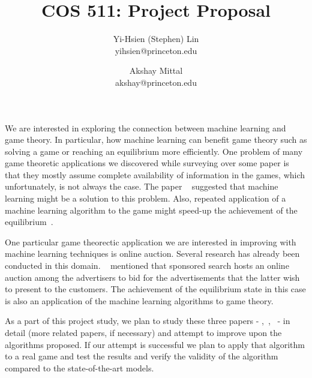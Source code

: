 \documentclass[12pt]{article}
\begin{document}
\title{COS 511: Project Proposal}
\author{
  Yi-Hsien (Stephen) Lin\\ yihsien@princeton.edu
  \and
  Akshay Mittal \\ akshay@princeton.edu
}
\date{}

\maketitle

\noindent 

We are interested in exploring the connection between machine learning and game theory. In particular, how machine learning can benefit game theory such as solving a game or reaching an equilibrium more efficiently. One problem of many game theoretic applications we discovered while surveying over some paper is that they mostly assume complete
 availability of information in the games, which unfortunately, is not always the case. The paper ~\cite{Blum:2006} suggested that machine learning might be a solution to this problem. Also, repeated application of a machine learning
 algorithm to the game might speed-up the achievement of the
 equilibrium~\cite{Freund:1996}.

One particular game theorectic application we are interested in improving with machine learning techniques is online auction. Several research has already been conducted in this domain. ~\cite{He:2013} mentioned that sponsored search
 hosts an online auction among the advertisers to bid for the advertisements
 that the latter wish to present to the customers. The achievement of the
 equilibrium state in this case is also an application of the machine learning
 algorithms to game theory. 

\noindent As a part of this project study, we plan to study these three papers -
\cite{Freund:1996},~\cite{Blum:2006},~\cite{He:2013} - in detail (more related
 papers, if necessary) and attempt to improve upon the algorithms proposed. If
 our attempt is successful we plan to apply that algorithm to a real game and
 test the results and verify the validity of the algorithm compared to the
 state-of-the-art models.


{\footnotesize


}
\end{document}
